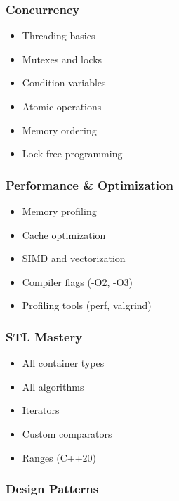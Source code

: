 \hypertarget{concurrency}{%
\subsubsection{Concurrency}\label{concurrency}}

\begin{itemize}
\tightlist
\item
  Threading basics
\item
  Mutexes and locks
\item
  Condition variables
\item
  Atomic operations
\item
  Memory ordering
\item
  Lock-free programming
\end{itemize}

\hypertarget{performance-optimization}{%
\subsubsection{Performance \&
Optimization}\label{performance-optimization}}

\begin{itemize}
\tightlist
\item
  Memory profiling
\item
  Cache optimization
\item
  SIMD and vectorization
\item
  Compiler flags (-O2, -O3)
\item
  Profiling tools (perf, valgrind)
\end{itemize}

\hypertarget{stl-mastery}{%
\subsubsection{STL Mastery}\label{stl-mastery}}

\begin{itemize}
\tightlist
\item
  All container types
\item
  All algorithms
\item
  Iterators
\item
  Custom comparators
\item
  Ranges (C++20)
\end{itemize}

\hypertarget{design-patterns}{%
\subsubsection{Design Patterns}\label{design-patterns}}


